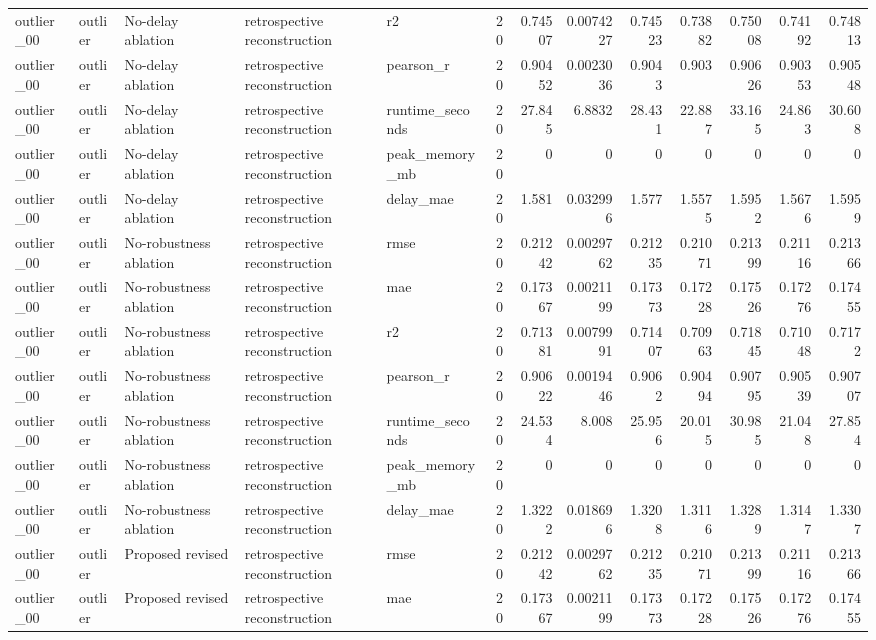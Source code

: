\begin{table}[!htbp]
{{\begin{tabular}{lllllrrrrrrrr}
outlier_00 & outlier & No-delay ablation & retrospective reconstruction & r2 & 20 & 0.74507 & 0.0074227 & 0.74523 & 0.73882 & 0.75008 & 0.74192 & 0.74813 \\
outlier_00 & outlier & No-delay ablation & retrospective reconstruction & pearson_r & 20 & 0.90452 & 0.0023036 & 0.9043 & 0.903 & 0.90626 & 0.90353 & 0.90548 \\
outlier_00 & outlier & No-delay ablation & retrospective reconstruction & runtime_seconds & 20 & 27.845 & 6.8832 & 28.431 & 22.887 & 33.165 & 24.863 & 30.608 \\
outlier_00 & outlier & No-delay ablation & retrospective reconstruction & peak_memory_mb & 20 & 0 & 0 & 0 & 0 & 0 & 0 & 0 \\
outlier_00 & outlier & No-delay ablation & retrospective reconstruction & delay_mae & 20 & 1.581 & 0.032996 & 1.577 & 1.5575 & 1.5952 & 1.5676 & 1.5959 \\
outlier_00 & outlier & No-robustness ablation & retrospective reconstruction & rmse & 20 & 0.21242 & 0.0029762 & 0.21235 & 0.21071 & 0.21399 & 0.21116 & 0.21366 \\
outlier_00 & outlier & No-robustness ablation & retrospective reconstruction & mae & 20 & 0.17367 & 0.0021199 & 0.17373 & 0.17228 & 0.17526 & 0.17276 & 0.17455 \\
outlier_00 & outlier & No-robustness ablation & retrospective reconstruction & r2 & 20 & 0.71381 & 0.0079991 & 0.71407 & 0.70963 & 0.71845 & 0.71048 & 0.7172 \\
outlier_00 & outlier & No-robustness ablation & retrospective reconstruction & pearson_r & 20 & 0.90622 & 0.0019446 & 0.9062 & 0.90494 & 0.90795 & 0.90539 & 0.90707 \\
outlier_00 & outlier & No-robustness ablation & retrospective reconstruction & runtime_seconds & 20 & 24.534 & 8.008 & 25.956 & 20.015 & 30.985 & 21.048 & 27.854 \\
outlier_00 & outlier & No-robustness ablation & retrospective reconstruction & peak_memory_mb & 20 & 0 & 0 & 0 & 0 & 0 & 0 & 0 \\
outlier_00 & outlier & No-robustness ablation & retrospective reconstruction & delay_mae & 20 & 1.3222 & 0.018696 & 1.3208 & 1.3116 & 1.3289 & 1.3147 & 1.3307 \\
outlier_00 & outlier & Proposed revised & retrospective reconstruction & rmse & 20 & 0.21242 & 0.0029762 & 0.21235 & 0.21071 & 0.21399 & 0.21116 & 0.21366 \\
outlier_00 & outlier & Proposed revised & retrospective reconstruction & mae & 20 & 0.17367 & 0.0021199 & 0.17373 & 0.17228 & 0.17526 & 0.17276 & 0.17455 \\

\end{tabular}}}
\end{table}
